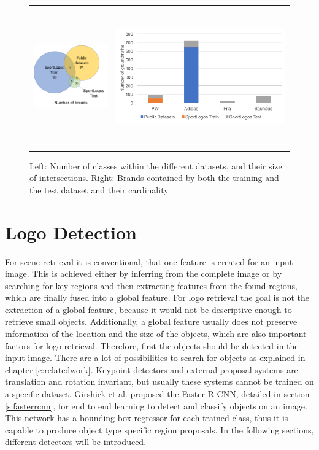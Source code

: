 \begin{figure}
  \centering
\begin{tabular}{cc}
  \includegraphics[height=40mm]{images/mt/brandintersections.pdf} &   \includegraphics[height=60mm]{images/mt/commonbrands.pdf}
\end{tabular}
\caption{Left: Number of classes within the different datasets, and their size of intersections. Right: Brands contained by both the training and the test dataset and their cardinality}
\label{f:commonbrands}
\end{figure}
\section{Logo Detection}\label{s:logodetection}
For scene retrieval it is conventional, that one feature is created for an input image. This is achieved either by inferring from the complete image or by searching for key regions and then extracting features from the found regions, which are finally fused into a global feature. For logo retrieval the goal is not the extraction of a global feature, because it would not be descriptive enough to retrieve small objects. Additionally, a global feature usually does not preserve information of the location and the size of the objects, which are also important factors for logo retrieval.
\bigbreak
Therefore, first the objects should be detected in the input image. There are a lot of possibilities to search for objects as explained in chapter \ref{c:relatedwork}. Keypoint detectors and external proposal systems are translation and rotation invariant, but usually these systems cannot be trained on a specific dataset. Girshick et al. \cite{NIPS2015_5638} proposed the Faster R-CNN, detailed in section \ref{s:fasterrcnn}, for end to end learning to detect and classify objects on an image. This network has a bounding box regressor for each trained class, thus it is capable to produce object type specific region proposals.
\bigbreak
In the following sections, different detectors will be introduced.
\bigbreak
